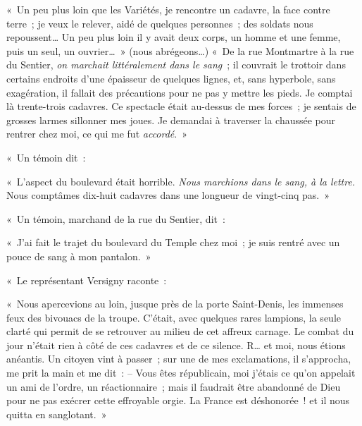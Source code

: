 \documentclass[french,twoside]{book} %
\newenvironment{quoteblock}%
  {\begin{quoting}}
  {\end{quoting}}
\newenvironment{quotebar}{%
    \def\FrameCommand{{\color{rubric!10!}\vrule width 0.5em} \hspace{0.9em}}%
    \def\OuterFrameSep{\itemsep} %
    \MakeFramed {\advance\hsize-\width \FrameRestore}
  }%
  {%
    \endMakeFramed
  }
\renewenvironment{quoteblock}%
  {%
    \savenotes
    \setstretch{0.9}
    \normalfont
    \begin{quotebar}
  }
  {%
    \end{quotebar}
    \spewnotes
  }
\begin{document}
\begin{quoteblock}
 \noindent « Un peu plus loin que les Variétés, je rencontre un cadavre, la face contre terre ; je veux le relever, aidé de quelques personnes ; des soldats nous repoussent… Un peu plus loin il y avait deux corps, un homme et une femme, puis un seul, un ouvrier… » (nous abrégeons…) « De la rue Montmartre à la rue du Sentier, \emph{on marchait littéralement dans le sang} ; il couvrait le trottoir dans certains endroits d’une épaisseur de quelques lignes, et, sans hyperbole, sans exagération, il fallait des précautions pour ne pas y mettre les pieds. Je comptai là trente-trois cadavres. Ce spectacle était au-dessus de mes forces ; je sentais de grosses larmes sillonner mes joues. Je demandai à traverser la chaussée pour rentrer chez moi, ce qui me fut \emph{accordé}. »
 \end{quoteblock}

\noindent « Un témoin dit :\par

\begin{quoteblock}
 \noindent « L’aspect du boulevard était horrible. \emph{Nous marchions dans le sang, à la lettre.} Nous comptâmes dix-huit cadavres dans une longueur de vingt-cinq pas. »
 \end{quoteblock}

\noindent « Un témoin, marchand de la rue du Sentier, dit :\par

\begin{quoteblock}
 \noindent « J’ai fait le trajet du boulevard du Temple chez moi ; je suis rentré avec un pouce de sang à mon pantalon. »
 \end{quoteblock}

\noindent « Le représentant Versigny raconte :\par

\begin{quoteblock}
 \noindent « Nous apercevions au loin, jusque près de la porte Saint-Denis, les immenses feux des bivouacs de la troupe. C’était, avec quelques rares lampions, la seule clarté qui permit de se retrouver au milieu de cet affreux carnage. Le combat du jour n’était rien à côté de ces cadavres et de ce silence. R… et moi, nous étions anéantis. Un citoyen vint à passer ; sur une de mes exclamations, il s’approcha, me prit la main et me dit : – Vous êtes républicain, moi j’étais ce qu’on appelait un ami de l’ordre, un réactionnaire ; mais il faudrait être abandonné de Dieu pour ne pas exécrer cette effroyable orgie. La France est déshonorée ! et il nous quitta en sanglotant. »
 \end{quoteblock}
\end{document}
